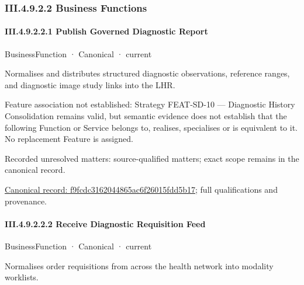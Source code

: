 \subsubsection*{III.4.9.2.2 Business Functions}
\label{navigation:III.4.9.2.2}

\paragraph*{III.4.9.2.2.1 Publish Governed Diagnostic Report}
\label{navigation:III.4.9.2.2.1}

\label{element:f9fcdc3162044865ac6f26015fdd5b17}
{\small BusinessFunction · Canonical · current}\par

Normalises and distributes structured diagnostic observations, reference ranges, and diagnostic image study links into the LHR.



Feature association not established: Strategy FEAT-SD-10 — Diagnostic History Consolidation remains valid, but semantic evidence does not establish that the following Function or Service belongs to, realises, specialises or is equivalent to it. No replacement Feature is assigned.


{\small Recorded unresolved matters: source-qualified matters; exact scope remains in the canonical record.}\par
{\footnotesize \href{../../../../../../../../continuum/business/business-function/f9fcdc3162044865ac6f26015fdd5b17.md}{Canonical record: f9fcdc3162044865ac6f26015fdd5b17}; full qualifications and provenance.}\par
\paragraph*{III.4.9.2.2.2 Receive Diagnostic Requisition Feed}
\label{navigation:III.4.9.2.2.2}

\label{element:af3d47ada486425abc5ab5d054db7004}
{\small BusinessFunction · Canonical · current}\par

Normalises order requisitions from across the health network into modality worklists.



